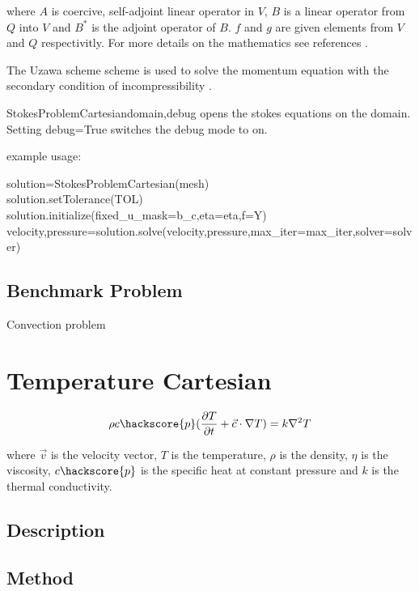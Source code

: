 where $A$ is coercive, self-adjoint linear operator in $V$, $B$ is a linear operator from $Q$ into $V$ and $B^{*}$ is the adjoint operator of $B$. $f$ and $g$ are given elements from $V$ and $Q$ respectivitly. For more details on the mathematics see references \cite{AAMIRBERKYAN2008,MBENZI2005}.

The Uzawa scheme scheme is used to solve the momentum equation with the secondary condition of incompressibility \cite{GROSS2006,AAMIRBERKYAN2008}.

\begin{classdesc}{StokesProblemCartesian}{domain,debug}
opens the stokes equations on the \Domain domain. Setting debug=True switches the debug mode to on.
\end{classdesc}

example usage:

solution=StokesProblemCartesian(mesh) \\
solution.setTolerance(TOL) \\
solution.initialize(fixed\_u\_mask=b\_c,eta=eta,f=Y) \\
velocity,pressure=solution.solve(velocity,pressure,max\_iter=max\_iter,solver=solver) \\

\subsection{Benchmark Problem}

Convection problem


\section{Temperature Cartesian}

\begin{equation}
\rho c\hackscore{p} \large(\frac{\partial T}{\partial t} + \vec{c} \cdot \nabla T \large) = k \nabla^{2}T
\label{HEAT EQUATION}
\end{equation}

where $\vec{v}$ is the velocity vector, $T$ is the temperature, $\rho$ is the density, $\eta$ is the viscosity, $c\hackscore{p}$ is the specific heat at constant pressure and $k$ is the thermal conductivity.

\subsection{Description}

\subsection{Method}

